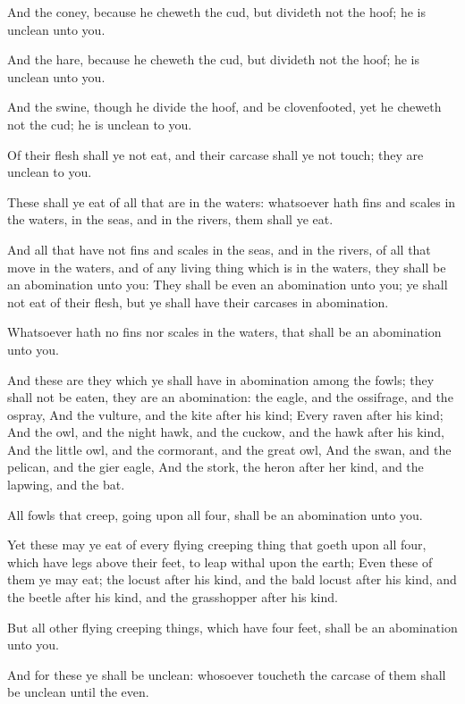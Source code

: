 \verse And the coney, because he cheweth the cud, but divideth not the hoof; he is unclean unto you.

\verse And the hare, because he cheweth the cud, but divideth not the hoof; he is unclean unto you.

\verse And the swine, though he divide the hoof, and be clovenfooted, yet he cheweth not the cud; he is unclean to you.

\verse Of their flesh shall ye not eat, and their carcase shall ye not touch; they are unclean to you.

\verse These shall ye eat of all that are in the waters: whatsoever hath fins and scales in the waters, in the seas, and in the rivers, them shall ye eat.

\verse And all that have not fins and scales in the seas, and in the rivers, of all that move in the waters, and of any living thing which is in the waters, they shall be an abomination unto you: \verse They shall be even an abomination unto you; ye shall not eat of their flesh, but ye shall have their carcases in abomination.

\verse Whatsoever hath no fins nor scales in the waters, that shall be an abomination unto you.

\verse And these are they which ye shall have in abomination among the fowls; they shall not be eaten, they are an abomination: the eagle, and the ossifrage, and the ospray, \verse And the vulture, and the kite after his kind; \verse Every raven after his kind; \verse And the owl, and the night hawk, and the cuckow, and the hawk after his kind, \verse And the little owl, and the cormorant, and the great owl, \verse And the swan, and the pelican, and the gier eagle, \verse And the stork, the heron after her kind, and the lapwing, and the bat.

\verse All fowls that creep, going upon all four, shall be an abomination unto you.

\verse Yet these may ye eat of every flying creeping thing that goeth upon all four, which have legs above their feet, to leap withal upon the earth; \verse Even these of them ye may eat; the locust after his kind, and the bald locust after his kind, and the beetle after his kind, and the grasshopper after his kind.

\verse But all other flying creeping things, which have four feet, shall be an abomination unto you.

\verse And for these ye shall be unclean: whosoever toucheth the carcase of them shall be unclean until the even.

